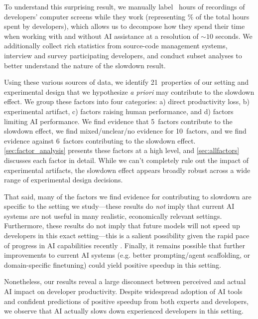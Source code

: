 \documentclass{article}
\newcommand{\NumFactorsTotal}{21}
\newcommand{\NumFactorsThatLikelyContribute}{5}
\newcommand{\NumFactorsThatAreUnclear}{10}
\newcommand{\NumFactorsThatDoNotContribute}{6}
\begin{document}
To understand this surprising result, we manually label \NumLabeledHoursVideoRecordingIncludingFiltered\ hours of recordings of developers' computer screens while they work (representing \PctTotalIssueTimeHasLabeledVideo\% of the total hours spent by developers), which allows us to decompose how they spend their time when working with and without AI assistance at a resolution of $\sim\!10$ seconds. We additionally collect rich statistics from source-code management systems, interview and survey participating developers, and conduct subset analyses to better understand the nature of the slowdown result.



Using these various sources of data, we identify \NumFactorsTotal~properties of our setting and experimental design that we hypothesize \textit{a priori} may contribute to the slowdown effect. 
We group these factors into four categories: a) direct productivity loss, b) experimental artifact, c) factors raising human performance, and d) factors limiting AI performance. 
We find evidence that \NumFactorsThatLikelyContribute~factors contribute to the slowdown effect, we find mixed/unclear/no evidence for \NumFactorsThatAreUnclear~factors, and we find evidence against \NumFactorsThatDoNotContribute~factors contributing to the slowdown effect. \autoref{sec:factor_analysis} presents these factors at a high level, and \autoref{sec:allfactors} discusses each factor in detail.
While we can't completely rule out the impact of experimental artifacts, the slowdown effect appears broadly robust across a wide range of experimental design decisions.

That said, many of the factors we find evidence for contributing to slowdown are specific to the setting we study---these results do \textit{not} imply that current AI systems are not useful in many realistic, economically relevant settings. 
Furthermore, these results do not imply that future models will not speed up developers in this exact setting---this is a salient possibility given the rapid pace of progress in AI capabilities recently \cite{kwa2025measuringai}. Finally, it remains possible that further improvements to current AI systems (e.g. better prompting/agent scaffolding, or domain-specific finetuning) could yield positive speedup in this setting.

Nonetheless, our results reveal a large disconnect between perceived and actual AI impact on developer productivity. Despite widespread adoption of AI tools and confident predictions of positive speedup from both experts and developers, we observe that AI actually slows down experienced developers in this setting.
\end{document}
